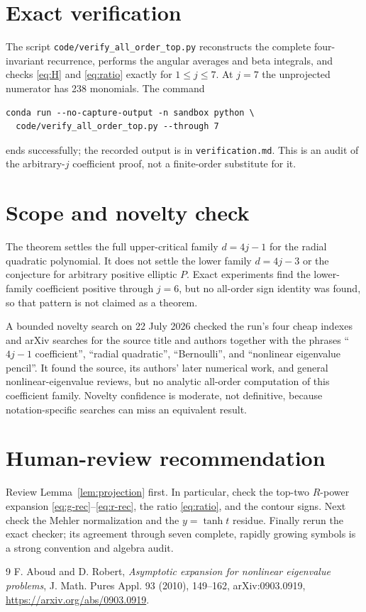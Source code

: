 \documentclass[11pt]{article}
\begin{document}
\section{Exact verification}

The script \texttt{code/verify\_all\_order\_top.py} reconstructs the complete
four-invariant recurrence, performs the angular averages and beta integrals,
and checks \eqref{eq:H} and \eqref{eq:ratio} exactly for $1\leq j\leq7$.
At $j=7$ the unprojected numerator has 238 monomials.  The command
\begin{verbatim}
conda run --no-capture-output -n sandbox python \
  code/verify_all_order_top.py --through 7
\end{verbatim}
ends successfully; the recorded output is in \texttt{verification.md}.
This is an audit of the arbitrary-$j$ coefficient proof, not a finite-order
substitute for it.

\section{Scope and novelty check}

The theorem settles the full upper-critical family $d=4j-1$ for the radial
quadratic polynomial.  It does not settle the lower family $d=4j-3$ or the
conjecture for arbitrary positive elliptic $P$.  Exact experiments find the
lower-family coefficient positive through $j=6$, but no all-order sign
identity was found, so that pattern is not claimed as a theorem.

A bounded novelty search on 22 July 2026 checked the run's four cheap indexes
and arXiv searches for the source title and authors together with the phrases
``$4j-1$ coefficient'', ``radial quadratic'', ``Bernoulli'', and
``nonlinear eigenvalue pencil''.  It found the source, its authors' later
numerical work, and general nonlinear-eigenvalue reviews, but no analytic
all-order computation of this coefficient family.  Novelty confidence is
moderate, not definitive, because notation-specific searches can miss an
equivalent result.

\section{Human-review recommendation}

Review Lemma~\ref{lem:projection} first.  In particular, check the top-two
$R$-power expansion \eqref{eq:g-rec}--\eqref{eq:r-rec}, the ratio
\eqref{eq:ratio}, and the contour signs.  Next check the Mehler normalization
and the $y=\tanh t$ residue.  Finally rerun the exact checker; its agreement
through seven complete, rapidly growing symbols is a strong convention and
algebra audit.

\begin{thebibliography}{9}
F. Aboud and D. Robert,
\emph{Asymptotic expansion for nonlinear eigenvalue problems},
J. Math. Pures Appl. 93 (2010), 149--162,
arXiv:0903.0919, \url{https://arxiv.org/abs/0903.0919}.
\end{thebibliography}
\end{document}

